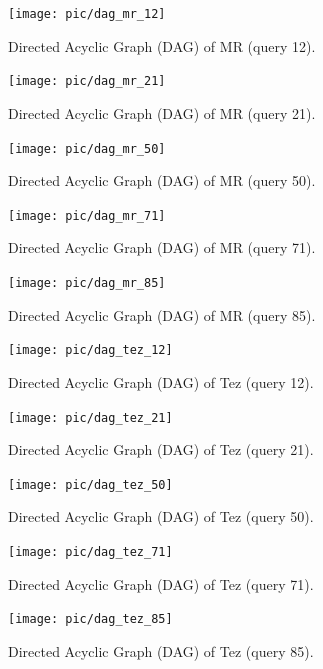 \documentclass[10pt]{article}
\begin{document}
\begin{figure}[htbp]
\centering
\begin{minipage}[t]{0.32\textwidth}
\centering
\texttt{[image: pic/dag\_mr\_12]}
\caption{Directed Acyclic Graph (DAG) of MR (query 12).}
\label{fig:q1d_mr_12}
\end{minipage}\hfill
\begin{minipage}[t]{0.32\textwidth}
\centering
\texttt{[image: pic/dag\_mr\_21]}
\caption{Directed Acyclic Graph (DAG) of MR (query 21).}
\label{fig:q1d_mr_21}
\end{minipage}\hfill
\begin{minipage}[t]{0.32\textwidth}
\centering
\texttt{[image: pic/dag\_mr\_50]}
\caption{Directed Acyclic Graph (DAG) of MR (query 50).}
\label{fig:q1d_mr_50}
\end{minipage}
\end{figure}

\begin{figure}[htbp]
\centering
\begin{minipage}[t]{0.48\textwidth}
\centering
\texttt{[image: pic/dag\_mr\_71]}
\caption{Directed Acyclic Graph (DAG) of MR (query 71).}
\label{fig:q1d_mr_71}
\end{minipage}\hfill
\begin{minipage}[t]{0.48\textwidth}
\centering
\texttt{[image: pic/dag\_mr\_85]}
\caption{Directed Acyclic Graph (DAG) of MR (query 85).}
\label{fig:q1d_mr_85}
\end{minipage}
\end{figure}

\begin{figure}[htbp]
\centering
\begin{minipage}[t]{0.25\textwidth}
  \centering
\texttt{[image: pic/dag\_tez\_12]}
\caption{Directed Acyclic Graph (DAG) of Tez (query 12).}
\label{fig:q1d_tez_12}
\end{minipage}\hfill
\begin{minipage}[t]{0.3\textwidth}
\centering
\texttt{[image: pic/dag\_tez\_21]}
\caption{Directed Acyclic Graph (DAG) of Tez (query 21).}
\label{fig:q1d_tez_21}
\end{minipage}\hfill
\begin{minipage}[t]{0.4\textwidth}
\centering
\texttt{[image: pic/dag\_tez\_50]}
\caption{Directed Acyclic Graph (DAG) of Tez (query 50).}
\label{fig:q1d_tez_50}
\end{minipage}
\end{figure}

\begin{figure}[htbp]
\centering
\begin{minipage}[t]{0.48\textwidth}
  \centering
\texttt{[image: pic/dag\_tez\_71]}
\caption{Directed Acyclic Graph (DAG) of Tez (query 71).}
\label{fig:q1d_tez_71}
\end{minipage}\hfill
\begin{minipage}[t]{0.48\textwidth}
\centering
\texttt{[image: pic/dag\_tez\_85]}
\caption{Directed Acyclic Graph (DAG) of Tez (query 85).}
\label{fig:q1d_tez_85}
\end{minipage}
\end{figure}
\end{document}
